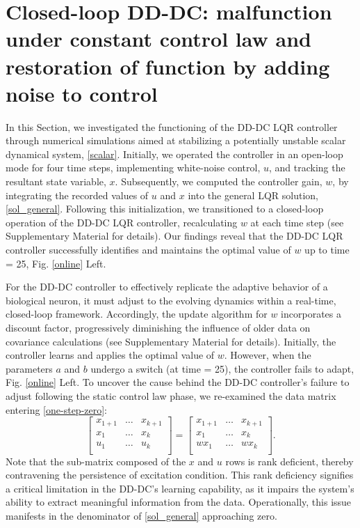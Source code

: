 \documentclass[9pt,twocolumn,twoside]{pnas-new}
\begin{document}
\section*{Closed-loop DD-DC: malfunction under constant control law and restoration of function by adding noise to control}

In this Section, we investigated the functioning of the DD-DC LQR controller through numerical simulations aimed at stabilizing a potentially unstable scalar dynamical system, \eqref{scalar}. Initially, we operated the controller in an open-loop mode for four time steps, implementing white-noise control, $u$, and tracking the resultant state variable, $x$. Subsequently, we computed the controller gain, $w$, by integrating the recorded values of $u$ and $x$ into the general LQR solution, \eqref{sol_general}. Following this initialization, we transitioned to a closed-loop operation of the DD-DC LQR controller, recalculating $w$ at each time step (see Supplementary Material for details). Our findings reveal that the DD-DC LQR controller successfully identifies and maintains the optimal value of $w$ up to time = 25, Fig. \ref{online} Left.

For the DD-DC controller to effectively replicate the adaptive behavior of a biological neuron, it must adjust to the evolving dynamics within a real-time, closed-loop framework. Accordingly, the update algorithm for $w$ incorporates a discount factor, progressively diminishing the influence of older data on covariance calculations (see Supplementary Material for details). Initially, the controller learns and applies the optimal value of $w$. However, when the parameters $a$ and $b$ undergo a switch (at time = 25), the controller fails to adapt, Fig. \ref{online} Left. To uncover the cause behind the DD-DC controller's failure to adjust following the static control law phase, we re-examined the data matrix entering \eqref{one-step-zero}: 
\begin{equation}
\label{degenerate}
\begin{bmatrix} x_{1+1} & \hdots & x_{k+1} \\  x_{1} & \hdots & x_{k}\\ u_{1} & \hdots & u_{k}\\\end{bmatrix}=\begin{bmatrix} x_{1+1} & \hdots & x_{k+1} \\  x_1 & \hdots & x_k\\ wx_1 & \hdots & wx_k\\\end{bmatrix}.
\end{equation}
Note that the sub-matrix composed of the $x$ and $u$ rows is rank deficient, thereby contravening the persistence of excitation condition. This rank deficiency signifies a critical limitation in the DD-DC's learning capability, as it impairs the system's ability to extract meaningful information from the data. Operationally, this issue manifests in the denominator of \eqref{sol_general} approaching zero.
\end{document}
